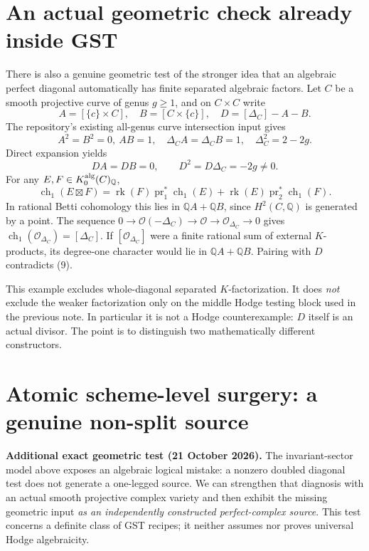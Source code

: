 \documentclass[11pt]{article}
\newcommand{\Q}{\mathbb Q}
\begin{document}
\section{An actual geometric check already inside GST}
There is also a genuine geometric test of the stronger idea
that an algebraic perfect diagonal automatically has finite separated
algebraic factors. Let \(C\) be a smooth projective curve of genus
\(g\geq1\), and on \(C\times C\) write
\[
 A=[\{c\}\times C],\quad B=[C\times\{c\}],\quad
 D=[\Delta_C]-A-B.
\]
The repository's existing all-genus curve intersection input gives
\[
 A^2=B^2=0,\ AB=1,\quad
 \Delta_C A=\Delta_C B=1,\quad \Delta_C^2=2-2g.
\]
Direct expansion yields
\[
 D A=D B=0,\qquad D^2=D\Delta_C=-2g\ne0.                     \tag{9}
\]
For any \(E,F\in K_0^{\rm alg}(C)_\Q\),
\[
 \operatorname{ch}_1(E\boxtimes F)=
 \operatorname{rk}(F)\operatorname{pr}_1^*\operatorname{ch}_1(E)
 +\operatorname{rk}(E)\operatorname{pr}_2^*\operatorname{ch}_1(F).
\]
In rational Betti cohomology this lies in \(\Q A+\Q B\), since
\(H^2(C,\Q)\) is generated by a point.
The sequence
\(0\to\mathcal O(-\Delta_C)\to\mathcal O\to\mathcal O_{\Delta_C}\to0\)
gives \(\operatorname{ch}_1(\mathcal O_{\Delta_C})=[\Delta_C]\).
If \([\mathcal O_{\Delta_C}]\) were a finite rational sum of external
\(K\)-products, its degree-one character would lie in
\(\Q A+\Q B\). Pairing with \(D\) contradicts (9).

This example excludes whole-diagonal separated \(K\)-factorization.
It does \emph{not} exclude the weaker factorization only on the
middle Hodge testing block used in the previous note. In particular
it is not a Hodge counterexample: \(D\) itself is an actual divisor.
The point is to distinguish two mathematically different constructors.


\section{Atomic scheme-level surgery: a genuine non-split source}
\noindent\textbf{Additional exact geometric test (21 October 2026).}
The invariant-sector model above exposes an algebraic logical mistake:
a nonzero doubled diagonal test does not generate a one-legged source.
We can strengthen that diagnosis with an actual smooth projective
complex variety and then exhibit the missing geometric input
\emph{as an independently constructed perfect-complex source}.
This test concerns a definite class of GST recipes; it neither assumes
nor proves universal Hodge algebraicity.
\end{document}
